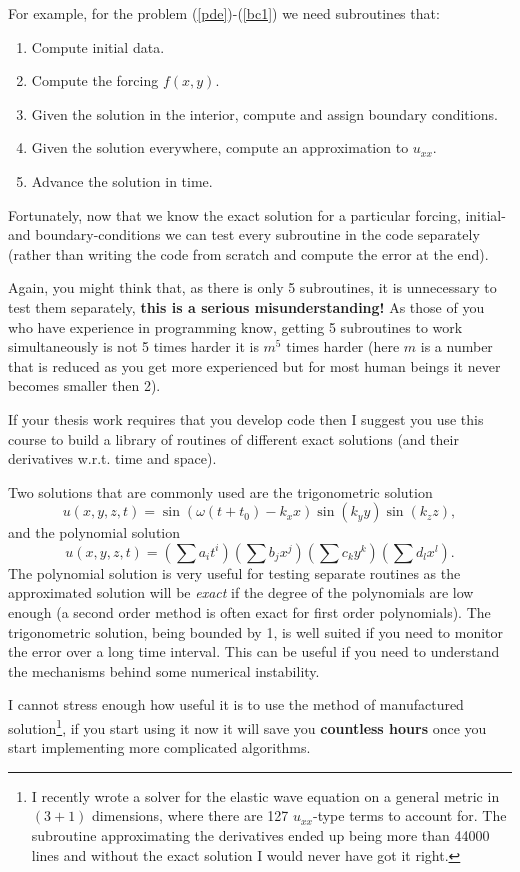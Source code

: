 \documentclass[11pt]{article}
\begin{document}
For example, for the problem (\ref{pde})-(\ref{bc1}) we need subroutines that:
\begin{enumerate}
\item Compute initial data. 
\item Compute the forcing $f(x,y)$.
\item Given the solution in the interior, compute and assign boundary conditions.
\item Given the solution everywhere, compute an approximation to $u_{xx}$.
\item Advance the solution in time.
\end{enumerate}
Fortunately, now that we know the exact solution for a particular forcing, initial- and boundary-conditions we can test every subroutine in the code separately (rather than writing the code from scratch and compute the error at the end). 

Again, you might think that, as there is only 5 subroutines, it is unnecessary to test them separately, {\bf this is a serious misunderstanding!} As those of you who have experience in programming know, getting 5 subroutines to work simultaneously is not 5 times harder it is $m^5$ times harder (here $m$ is a number that is reduced as you get more experienced but for most human beings it never becomes smaller then 2). 

If your thesis work requires that you develop code then I suggest you use this course to build a library of routines of different exact solutions (and their derivatives w.r.t. time and space). 

Two solutions that are commonly used are the trigonometric solution
\[
u(x,y,z,t)= \sin(\omega (t+t_0) -k_x x) \sin( k_y y)\sin(k_z z),
\]
and the polynomial solution
\[
u(x,y,z,t)= \left(\sum a_i t^i \right) \left(\sum b_j x^j \right)\left(\sum c_k y^k \right)\left(\sum d_l x^l \right).
\]
The polynomial solution is very useful for testing separate routines as the approximated solution will be \emph{exact} if the degree of the polynomials are low enough (a second order method is often exact for first order polynomials).  
The trigonometric solution, being bounded by 1, is well suited if you need to monitor the error over a long time interval. This can be useful if you need to understand the mechanisms behind some numerical instability. 

I cannot stress enough how useful it is to use the method of manufactured solution\footnote{I recently wrote a solver for the elastic wave equation on a general metric in $(3+1)$ dimensions, where there are 127 $u_{xx}$-type terms to account for. The subroutine approximating the derivatives ended up being more than 44000 lines and without the exact solution I would never have got it right.}, if you start using it now it will save you {\bf countless hours} once you start implementing more complicated algorithms.
\end{document}
